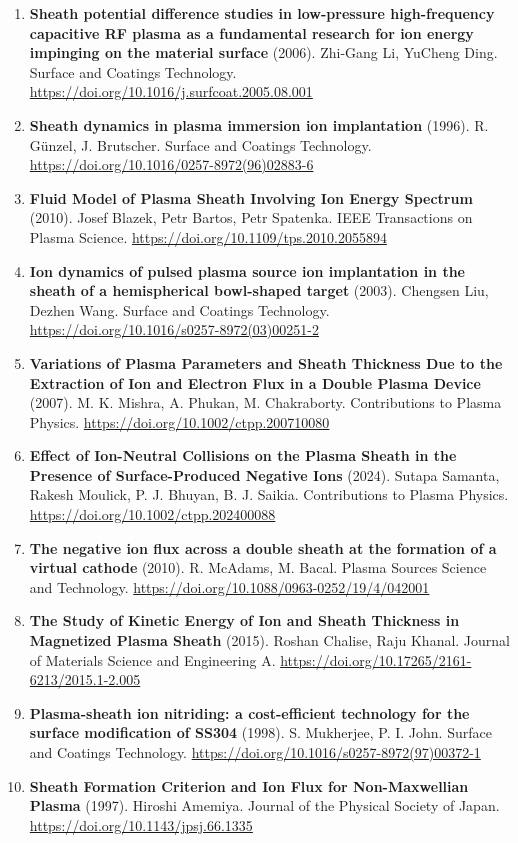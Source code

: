 \documentclass[11pt,a4paper]{article}
\begin{document}
\begin{enumerate}[leftmargin=1.4em]
\item \textbf{Sheath potential difference studies in low-pressure high-frequency capacitive RF plasma as a fundamental research for ion energy impinging on the material surface} (2006). Zhi-Gang Li, YuCheng Ding. Surface and Coatings Technology. \url{https://doi.org/10.1016/j.surfcoat.2005.08.001}
\item \textbf{Sheath dynamics in plasma immersion ion implantation} (1996). R. Günzel, J. Brutscher. Surface and Coatings Technology. \url{https://doi.org/10.1016/0257-8972(96)02883-6}
\item \textbf{Fluid Model of Plasma Sheath Involving Ion Energy Spectrum} (2010). Josef Blazek, Petr Bartos, Petr Spatenka. IEEE Transactions on Plasma Science. \url{https://doi.org/10.1109/tps.2010.2055894}
\item \textbf{Ion dynamics of pulsed plasma source ion implantation in the sheath of a hemispherical bowl-shaped target} (2003). Chengsen Liu, Dezhen Wang. Surface and Coatings Technology. \url{https://doi.org/10.1016/s0257-8972(03)00251-2}
\item \textbf{Variations of Plasma Parameters and Sheath Thickness Due to the Extraction of Ion and Electron Flux in a Double Plasma Device} (2007). M. K. Mishra, A. Phukan, M. Chakraborty. Contributions to Plasma Physics. \url{https://doi.org/10.1002/ctpp.200710080}
\item \textbf{Effect of Ion-Neutral Collisions on the Plasma Sheath in the Presence of Surface-Produced Negative Ions} (2024). Sutapa Samanta, Rakesh Moulick, P. J. Bhuyan, B. J. Saikia. Contributions to Plasma Physics. \url{https://doi.org/10.1002/ctpp.202400088}
\item \textbf{The negative ion flux across a double sheath at the formation of a virtual cathode} (2010). R. McAdams, M. Bacal. Plasma Sources Science and Technology. \url{https://doi.org/10.1088/0963-0252/19/4/042001}
\item \textbf{The Study of Kinetic Energy of Ion and Sheath Thickness in Magnetized Plasma Sheath} (2015). Roshan Chalise, Raju Khanal. Journal of Materials Science and Engineering A. \url{https://doi.org/10.17265/2161-6213/2015.1-2.005}
\item \textbf{Plasma-sheath ion nitriding: a cost-efficient technology for the surface modification of SS304} (1998). S. Mukherjee, P. I. John. Surface and Coatings Technology. \url{https://doi.org/10.1016/s0257-8972(97)00372-1}
\item \textbf{Sheath Formation Criterion and Ion Flux for Non-Maxwellian Plasma} (1997). Hiroshi Amemiya. Journal of the Physical Society of Japan. \url{https://doi.org/10.1143/jpsj.66.1335}

\end{enumerate}
\end{document}
